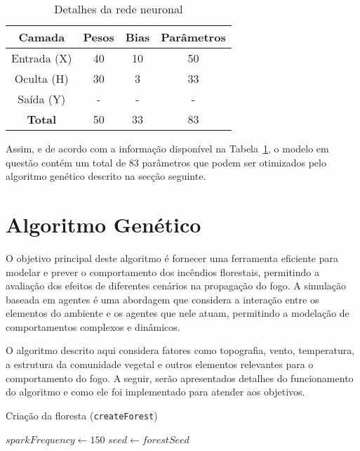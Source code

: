 \begin{table}[htpb]
    \centering
    \begin{tabular}{cccc} \hline
    Camada & Pesos & Bias & Parâmetros \\ \hline
    Entrada (X) & 40 & 10 & 50 \\
    Oculta (H) & 30 & 3 & 33 \\
    Saída (Y) & - & - & - \\ \hline
    \textbf{Total} & 50 & 33 & 83 \\ \hline
    \end{tabular}
    \caption{Detalhes da rede neuronal}
    \label{tab:nn_summary}
\end{table}

Assim, e de acordo com a informação disponível na Tabela~\ref{tab:nn_summary}, o modelo em questão contém um total de 83 parâmetros que podem ser otimizados pelo algoritmo genético descrito na secção seguinte.

\section{Algoritmo Genético}\label{sec:gen_alg}

O objetivo principal deste algoritmo é fornecer uma ferramenta eficiente para modelar e prever o comportamento dos incêndios florestais, permitindo a avaliação dos efeitos de diferentes cenários na propagação do fogo. A simulação baseada em agentes é uma abordagem que considera a interação entre os elementos do ambiente e os agentes que nele atuam, permitindo a modelação de comportamentos complexos e dinâmicos. 

O algoritmo descrito aqui considera fatores como topografia, vento, temperatura, a estrutura da comunidade vegetal e outros elementos relevantes para o comportamento do fogo. A seguir, serão apresentados detalhes do funcionamento do algoritmo e como ele foi implementado para atender aos objetivos.


\begin{algorithm}
    \caption{Criação da floresta (\texttt{createForest})}\label{alg:create_forest}
    $sparkFrequency \gets 150$\;
    $seed \gets forestSeed$\;
\end{algorithm}

